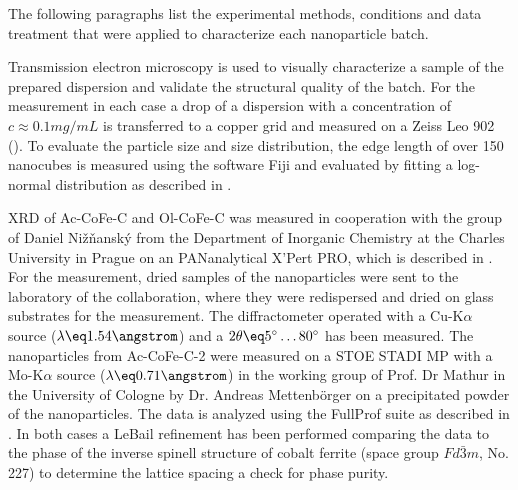 \documentclass[\main/dresen_thesis.tex]{subfiles}
\begin{document}
  \label{sec:monolayers:nanoparticle:structuralCharacterization}
  The following paragraphs list the experimental methods, conditions and data treatment that were applied to characterize each nanoparticle batch.

    Transmission electron microscopy is used to visually characterize a sample of the prepared dispersion and validate the structural quality of the batch.
    For the measurement in each case a drop of a dispersion with a concentration of $c \approx 0.1 \unit{mg/mL}$ is transferred to a copper grid and measured on a Zeiss Leo 902 ().
    To evaluate the particle size and size distribution, the edge length of over 150 nanocubes is measured using the software Fiji \cite{Schindelin_2012_Fijia} and evaluated by fitting a log-normal distribution as described in .

    XRD of Ac-CoFe-C and Ol-CoFe-C was measured in cooperation with the group of Daniel Nižňanský from the Department of Inorganic Chemistry at the Charles University in Prague on an PANanalytical X'Pert PRO, which is described in .
    For the measurement, dried samples of the nanoparticles were sent to the laboratory of the collaboration, where they were redispersed and dried on glass substrates for the measurement.
    The diffractometer operated with a Cu-K$\alpha$ source ($\lambda \eq 1.54 \angstrom$) and a $2 \theta \eq 5^\circ \ldots 80^\circ$ has been measured.
    The nanoparticles from Ac-CoFe-C-2 were measured on a STOE STADI MP with a Mo-K$\alpha$ source ($\lambda \eq 0.71 \angstrom$) in the working group of Prof. Dr Mathur in the University of Cologne by Dr. Andreas Mettenb\"orger on a precipitated powder of the nanoparticles.
    The data is analyzed using the FullProf suite \cite{Rodriguez_1993_Recen} as described in .
    In both cases a LeBail refinement has been performed comparing the data to the phase of the inverse spinell structure of cobalt ferrite (space group $Fd\bar{3}m$, No. 227) to determine the lattice spacing a check for phase purity.
\end{document}
